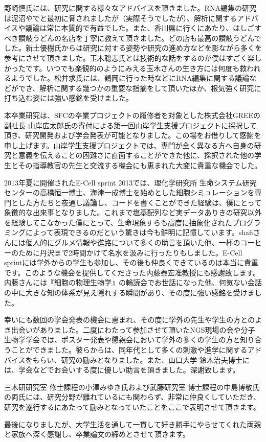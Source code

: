 \par
野崎慎氏には、研究に関する様々なアドバイスを頂きました。RNA編集の研究は泥沼やでと最初に脅されましたが（実際そうでしたが）、解析に関するアドバイスや議論は常に本質的で有益でした。また、香川県に行くにあたり、はしごすべき讃岐うどんの名店を丁寧に教えて頂きました。どの店も最高の讃岐うどんでした。新土優樹氏からは研究に対する姿勢や研究の進め方などを影ながら多くを参考にさせて頂きました。玉木聡志氏とは技術的な話をするのが僕はすごく楽しかったです。いつでも楽観的のようにみえる玉木さんの生き方には何度も救われるようでした。松井求氏には、鶴岡に行った時などにRNA編集に関する議論などができ、解析に関する幾つかの重要な指摘をして頂いたほか、根気強く研究に打ち込む姿には強い感銘を受けました。
\par
本卒業研究は、SFCの卒業プロジェクトの履修者を対象とした株式会社GREEの副社長 山岸広太郎氏の寄付による第一回山岸学生支援プロジェクトに採択して頂き、研究開発および学会発表が可能となりました。この場をお借りして感謝を申し上げます。山岸学生支援プロジェクトでは、専門が全く異なる方へ自身の研究と意義を伝えることの困難さに直面することができた他に、採択された他の学生とその指導教官の先生と交流する機会にも恵まれた大変に貴重な機会でした。
\par
2013年夏に開催されたE-Cell sprint 2013では、理化学研究所 生命システム研究センターの高橋恒一博士、海津一成博士を始めとした細胞シミュレーションを専門とした方たちと夜通し議論し、コードを書くことができた経験は、僕にとって象徴的な出来事となりました。これまで塩基配列など実データありきの研究以外を経験してこなかった僕にとって、生命現象すらも高度に抽象化されたプログラミングによって表現できるのだという驚きは今も鮮明に記憶しています。shafiさんには個人的にグルメ情報や進路について多くの助言を頂いた他、一杯のコーヒーのために丹沢まで2時間かけて名水を汲みに行ったりもしました。E-Cell sprintには学外からの学生も参加し、その後も仲良くできているのは本当に貴重です。このような機会を提供してくださった内藤泰宏准教授にも感謝致します。内藤さんには『細胞の物理生物学』の輪読会でお世話になった他、何気ない会話の中に大きな知の体系が見え隠れする瞬間があり、その度に強い感銘を受けました。
\par
幸いにも数回の学会発表の機会に恵まれ、その度に学外の先生や学生の方とのよき出会いがありました。二度にわたって参加させて頂いたNGS現場の会や分子生物学学会では、ポスター発表や懇親会において学外の多くの学生の方と知り合うことができました。彼らからは、同年代として多くの刺激や進学に関するアドバイスをもらい、研究の励みとなりました。また、山口大学 鈴木治夫博士には、学会などでお会いする度に優しい助言を頂きました。深謝致します。
\par
三木研研究室 修士課程の小澤みゆき氏および武藤研究室 博士課程の中島博敬氏の両氏には、研究分野が離れているにも関わらず、非常に仲良くしていただき、研究を遂行するにあたって励みとなっていたことをここで表明させて頂きます。
\par
最後になりましたが、大学生活を通して一貫して好き勝手にやらせてくれた両親と家族へ深く感謝し、卒業論文の締めとさせて頂きます。
